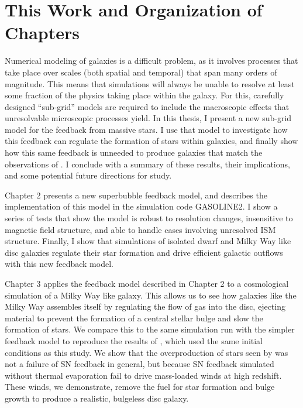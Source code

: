 \section{This Work and Organization of Chapters}
Numerical modeling of galaxies is a difficult problem, as it involves processes
that take place over scales (both spatial and temporal) that span many orders of
magnitude.  This means that simulations will always be unable to resolve at
least some fraction of the physics taking place within the galaxy.  For this,
carefully designed ``sub-grid'' models are required to include the macroscopic
effects that unresolvable microscopic processes yield.  In this thesis, I
present a new sub-grid model for the feedback from massive stars.  I
use that model to investigate how this feedback can regulate the formation of
stars within galaxies, and finally show how this same
feedback is unneeded to produce galaxies that match the observations of
\citet{McGaugh2016}.  I conclude with a summary of these results,
their implications, and some potential future directions for study.

Chapter 2 presents a new superbubble feedback model, and describes the
implementation of this model in the simulation code {\sc GASOLINE2}.  I show a
series of tests that show the model is robust to resolution changes, insensitive
to magnetic field structure, and able to handle cases involving unresolved ISM
structure.  Finally, I show that simulations of isolated dwarf and Milky Way
like disc galaxies regulate their star formation and drive efficient galactic
outflows with this new feedback model.

Chapter 3 applies the feedback model described in Chapter 2 to a cosmological
simulation of a Milky Way like galaxy.  This allows us to see how galaxies like
the Milky Way assembles itself by regulating the flow of gas into the disc,
ejecting material to prevent the formation of a central stellar bulge and slow
the formation of stars.  We compare this to the same simulation run with the
simpler \citet{Stinson2006} feedback model to reproduce the results of
\citet{Stinson2010}, which used the same initial conditions as this study.  We
show that the overproduction of stars seen by \citet{Stinson2010} was not a
failure of SN feedback in general, but because SN feedback simulated without 
thermal evaporation fail to drive mass-loaded winds at high redshift.  These
winds, we demonstrate, remove the fuel for star formation and bulge growth to
produce a realistic, bulgeless disc galaxy.


